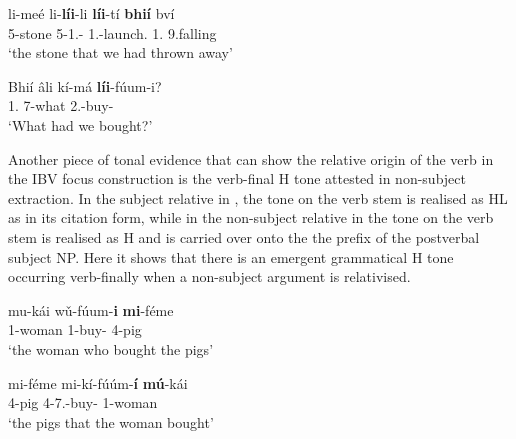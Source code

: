 \documentclass[output=paper,colorlinks,citecolor=brown,
]{langscibook}
\begin{document}
\begin{exe}
\ex
\label{147}
\gll
li-meé li-\textbf{líi}-li \textbf{líi}-tí \textbf{bhií} bví\\
5-stone 5\Rel{}-1\Pl{}.\Rpst{}-\Cop{} 1\Pl{}.\Rpst{}-launch.\Pst{} 1\Pl{}.\Pro{} 9.falling\\
\trans ‘the stone that we had thrown away’

\end{exe}
\begin{exe}
\ex
\label{148}
\gll
Bhií \^{a}li kí-má \textbf{líi}-fúum-i?\\
1\Pl{}.\Pro{} \Pst{} 7-what 2\Pl{}.\Pst{}-buy-\Pst{}\\
\trans ‘What had we bought?’

\end{exe}
Another piece of tonal evidence that can show the relative origin of the verb in the IBV focus construction is the verb-final H tone attested in non-subject extraction. In the subject relative in , the tone on the verb stem is realised as HL as in its citation form, while in the non-subject relative in  the tone on the verb stem is realised as H and is carried over onto the the prefix of the postverbal subject NP. Here it shows that there is an emergent grammatical H tone occurring verb-finally when a non-subject argument is relativised.
\begin{exe}
    \ex \label{149}
    \begin{xlist}
\ex
\label{149a}
\gll
mu-kái wǔ-fúum-\textbf{i} \textbf{mi}-féme\\
1-woman 1\Rel{}-buy-\Pst{} 4-pig\\
\trans ‘the woman who bought the pigs’ 

\ex
\label{149b}
\gll
mi-féme mi-kí-fúúm-\textbf{í} \textbf{mú}-kái\\
4-pig 4\Rel{}-7\Sm{}.\Pst{}-buy-\Pst{} 1-woman\\
\trans ‘the pigs that the woman bought’ 

    \end{xlist}
\end{exe}
\end{document}
